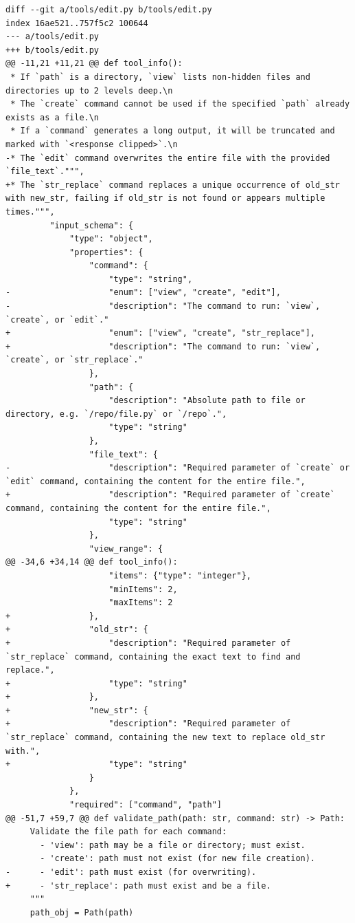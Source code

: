 \documentclass{article}
\begin{document}
\begin{lstlisting}[style=diffstyle]
diff --git a/tools/edit.py b/tools/edit.py
index 16ae521..757f5c2 100644
--- a/tools/edit.py
+++ b/tools/edit.py
@@ -11,21 +11,21 @@ def tool_info():
 * If `path` is a directory, `view` lists non-hidden files and directories up to 2 levels deep.\n
 * The `create` command cannot be used if the specified `path` already exists as a file.\n
 * If a `command` generates a long output, it will be truncated and marked with `<response clipped>`.\n
-* The `edit` command overwrites the entire file with the provided `file_text`.""",
+* The `str_replace` command replaces a unique occurrence of old_str with new_str, failing if old_str is not found or appears multiple times.""",
         "input_schema": {
             "type": "object",
             "properties": {
                 "command": {
                     "type": "string",
-                    "enum": ["view", "create", "edit"],
-                    "description": "The command to run: `view`, `create`, or `edit`."
+                    "enum": ["view", "create", "str_replace"],
+                    "description": "The command to run: `view`, `create`, or `str_replace`."
                 },
                 "path": {
                     "description": "Absolute path to file or directory, e.g. `/repo/file.py` or `/repo`.",
                     "type": "string"
                 },
                 "file_text": {
-                    "description": "Required parameter of `create` or `edit` command, containing the content for the entire file.",
+                    "description": "Required parameter of `create` command, containing the content for the entire file.",
                     "type": "string"
                 },
                 "view_range": {
@@ -34,6 +34,14 @@ def tool_info():
                     "items": {"type": "integer"},
                     "minItems": 2,
                     "maxItems": 2
+                },
+                "old_str": {
+                    "description": "Required parameter of `str_replace` command, containing the exact text to find and replace.",
+                    "type": "string"
+                },
+                "new_str": {
+                    "description": "Required parameter of `str_replace` command, containing the new text to replace old_str with.",
+                    "type": "string"
                 }
             },
             "required": ["command", "path"]
@@ -51,7 +59,7 @@ def validate_path(path: str, command: str) -> Path:
     Validate the file path for each command:
       - 'view': path may be a file or directory; must exist.
       - 'create': path must not exist (for new file creation).
-      - 'edit': path must exist (for overwriting).
+      - 'str_replace': path must exist and be a file.
     """
     path_obj = Path(path)
 

\end{lstlisting}
\end{document}
